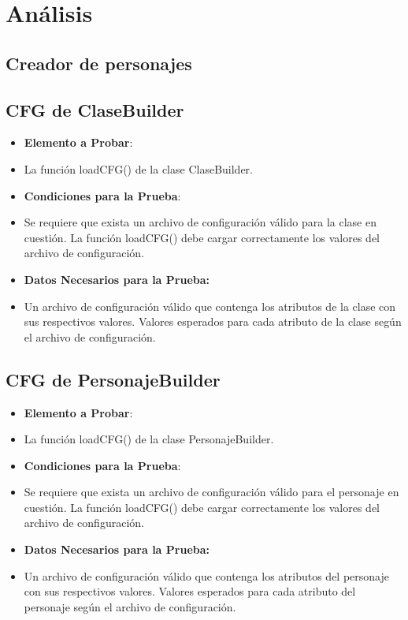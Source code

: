 \documentclass{article}
\begin{document}
\newpage
\section{Análisis}

\subsection{Creador de personajes}

\subsection{CFG de ClaseBuilder}
\renewcommand{\labelitemi}{}
\begin{itemize}

\item \textbf{Elemento a Probar}: 

\item La función loadCFG() de la clase ClaseBuilder.

\item \textbf{Condiciones para la Prueba}:

\item Se requiere que exista un archivo de configuración válido para la clase en cuestión. La función loadCFG() debe cargar correctamente los valores del archivo de configuración.
   
\item \textbf{Datos Necesarios para la Prueba:}

\item Un archivo de configuración válido que contenga los atributos de la clase con sus respectivos valores.
Valores esperados para cada atributo de la clase según el archivo de configuración.

\end{itemize}


\subsection{CFG de PersonajeBuilder}
\renewcommand{\labelitemi}{}
\begin{itemize}

\item \textbf{Elemento a Probar}:

\item La función loadCFG() de la clase PersonajeBuilder.

\item \textbf{Condiciones para la Prueba}:

\item Se requiere que exista un archivo de configuración válido para el personaje en cuestión.
La función loadCFG() debe cargar correctamente los valores del archivo de configuración.

\item \textbf{Datos Necesarios para la Prueba:}

\item Un archivo de configuración válido que contenga los atributos del personaje con sus respectivos valores.
Valores esperados para cada atributo del personaje según el archivo de configuración.

\end{itemize}
\end{document}
